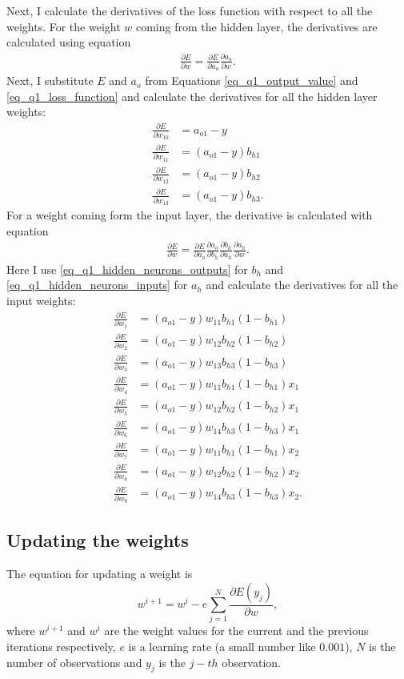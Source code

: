 Next, I calculate the derivatives of the loss function with respect to all the weights. For the weight $w$ coming from the hidden layer, the derivatives are calculated using equation
\begin{align*}
  \frac{\partial E}{\partial w} = \frac{\partial E}{\partial a_o} \frac{\partial a_o} {\partial w}.
\end{align*}
Next, I substitute $E$ and $a_o$ from Equations \ref{eq_q1_output_value} and \ref{eq_q1_loss_function} and calculate the derivatives for all the hidden layer weights:
\begin{align*}
  \frac{\partial E}{\partial w_{10}} &= a_{o1} - y \\
  \frac{\partial E}{\partial w_{11}} &= (a_{o1} - y) b_{h1} \\
  \frac{\partial E}{\partial w_{12}} &= (a_{o1} - y) b_{h2} \\
  \frac{\partial E}{\partial w_{13}} &= (a_{o1} - y) b_{h3}.
\end{align*}
For a weight coming form the input layer, the derivative is calculated with equation
\begin{align*}
  \frac{\partial E}{\partial w} = \frac{\partial E}{\partial a_o} \frac{\partial a_o} {\partial b_h} \frac{\partial b_h} {\partial a_h} \frac{\partial a_h} {\partial w}.
\end{align*}
Here I use \autoref{eq_q1_hidden_neurons_outputs} for $b_h$ and \autoref{eq_q1_hidden_neurons_inputs} for $a_h$ and calculate the derivatives for all the input weights:
\begin{align*}
  \frac{\partial E}{\partial w_{1}} &= (a_{o1} - y) w_{11} b_{h1} (1 - b_{h1}) \\
  \frac{\partial E}{\partial w_{2}} &= (a_{o1} - y) w_{12} b_{h2} (1 - b_{h2}) \\
  \frac{\partial E}{\partial w_{3}} &= (a_{o1} - y) w_{13} b_{h3} (1 - b_{h3}) \\
  \frac{\partial E}{\partial w_{4}} &= (a_{o1} - y) w_{11} b_{h1} (1 - b_{h1}) x_1 \\
  \frac{\partial E}{\partial w_{5}} &= (a_{o1} - y) w_{12} b_{h2} (1 - b_{h2}) x_1 \\
  \frac{\partial E}{\partial w_{6}} &= (a_{o1} - y) w_{14} b_{h3} (1 - b_{h3}) x_1 \\
  \frac{\partial E}{\partial w_{7}} &= (a_{o1} - y) w_{11} b_{h1} (1 - b_{h1}) x_2 \\
  \frac{\partial E}{\partial w_{8}} &= (a_{o1} - y) w_{12} b_{h2} (1 - b_{h2}) x_2 \\
  \frac{\partial E}{\partial w_{9}} &= (a_{o1} - y) w_{14} b_{h3} (1 - b_{h3}) x_2.
\end{align*}

\subsection{Updating the weights}

The equation for updating a weight is
\[
  w^{i+1} = w^{i} - e \sum_{j=1}^{N} \frac{\partial E(y_j)}{\partial w},
\]
where $w^{i+1}$ and $w^{i}$ are the weight values for the current and the previous iterations respectively, $e$ is a learning rate (a small number like $0.001$), $N$ is the number of observations and $y_j$ is the $j-th$ observation.
